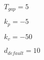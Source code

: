 \documentclass{article}
\begin{document}
$T_{gap} = 5$

$k_p = -5$

$k_v = -50$

$d_{default} = 10$
\end{document}
